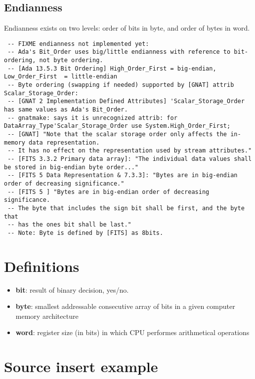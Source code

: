 \documentclass[a4paper,10pt]{article}
\begin{document}
\subsection{Endianness}

Endianness exists on two levels: order of bits in byte, 
and order of bytes in word.

\begin{verbatim}
 -- FIXME endianness not implemented yet:
 -- Ada's Bit_Order uses big/little endianness with reference to bit-ordering, not byte ordering.
 -- [Ada 13.5.3 Bit Ordering] High_Order_First = big-endian, Low_Order_First  = little-endian
 -- Byte ordering (swapping if needed) supported by [GNAT] attrib Scalar_Storage_Order:
 -- [GNAT 2 Implementation Defined Attributes] 'Scalar_Storage_Order has same values as Ada's Bit_Order.
 -- gnatmake: says it is unrecognized attrib: for DataArray_Type'Scalar_Storage_Order use System.High_Order_First;
 -- [GNAT] "Note that the scalar storage order only affects the in-memory data representation.
 -- It has no effect on the representation used by stream attributes."
 -- [FITS 3.3.2 Primary data array]: "The individual data values shall be stored in big-endian byte order..."
 -- [FITS 5 Data Representation & 7.3.3]: "Bytes are in big-endian order of decreasing significance."
 -- [FITS 5 ] "Bytes are in big-endian order of decreasing significance.
 -- The byte that includes the sign bit shall be first, and the byte that
 -- has the ones bit shall be last."
 -- Note: Byte is defined by [FITS] as 8bits.
\end{verbatim}

\section{Definitions}

\begin{itemize}
\item \textbf{bit}: result of binary decision, yes/no.
\item \textbf{byte}: smallest addressable consecutive array of bits in a given computer memory architecture
\item \textbf{word}: register size (in bits) in which CPU performes arithmetical operations
\end{itemize}




\section{Source insert example}
\end{document}
